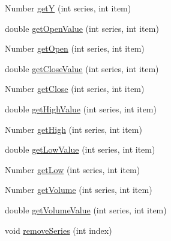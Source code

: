 \begin{DoxyCompactItemize}
\item 
Number \mbox{\hyperlink{classorg_1_1jfree_1_1data_1_1time_1_1ohlc_1_1_o_h_l_c_series_collection_a39ab3e7c0f3444b23cf9d768a5c52cd8}{getY}} (int series, int item)
\item 
double \mbox{\hyperlink{classorg_1_1jfree_1_1data_1_1time_1_1ohlc_1_1_o_h_l_c_series_collection_a3184febfa7139d57a1821c4d24d59360}{get\+Open\+Value}} (int series, int item)
\item 
Number \mbox{\hyperlink{classorg_1_1jfree_1_1data_1_1time_1_1ohlc_1_1_o_h_l_c_series_collection_aab9642612da56d8b23037a2e0ab64f64}{get\+Open}} (int series, int item)
\item 
double \mbox{\hyperlink{classorg_1_1jfree_1_1data_1_1time_1_1ohlc_1_1_o_h_l_c_series_collection_a599e2f3c9be3e6e5d9ab15e6f1bfc2ea}{get\+Close\+Value}} (int series, int item)
\item 
Number \mbox{\hyperlink{classorg_1_1jfree_1_1data_1_1time_1_1ohlc_1_1_o_h_l_c_series_collection_a6746247a2fcb824cfdcde9dff7d83d13}{get\+Close}} (int series, int item)
\item 
double \mbox{\hyperlink{classorg_1_1jfree_1_1data_1_1time_1_1ohlc_1_1_o_h_l_c_series_collection_ae49cdfb833330fec9bb8a8e21683945c}{get\+High\+Value}} (int series, int item)
\item 
Number \mbox{\hyperlink{classorg_1_1jfree_1_1data_1_1time_1_1ohlc_1_1_o_h_l_c_series_collection_a8ff1342849ccce17620f04158a99792b}{get\+High}} (int series, int item)
\item 
double \mbox{\hyperlink{classorg_1_1jfree_1_1data_1_1time_1_1ohlc_1_1_o_h_l_c_series_collection_a23473c76cc9364c1b6a646014eab2423}{get\+Low\+Value}} (int series, int item)
\item 
Number \mbox{\hyperlink{classorg_1_1jfree_1_1data_1_1time_1_1ohlc_1_1_o_h_l_c_series_collection_a94216d1171b19bc6b3268f570a2c9457}{get\+Low}} (int series, int item)
\item 
Number \mbox{\hyperlink{classorg_1_1jfree_1_1data_1_1time_1_1ohlc_1_1_o_h_l_c_series_collection_a39320d1f0ac295608b343df4bde3b4a6}{get\+Volume}} (int series, int item)
\item 
double \mbox{\hyperlink{classorg_1_1jfree_1_1data_1_1time_1_1ohlc_1_1_o_h_l_c_series_collection_aaf9b44fedb9a8de27d541cb6e86c349b}{get\+Volume\+Value}} (int series, int item)
\item 
void \mbox{\hyperlink{classorg_1_1jfree_1_1data_1_1time_1_1ohlc_1_1_o_h_l_c_series_collection_a491923bcd0ec24d24643c2fea875f950}{remove\+Series}} (int index)
\item 

\end{DoxyCompactItemize}
